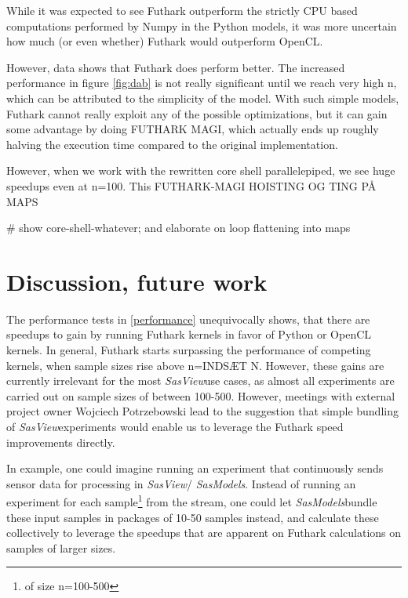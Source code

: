 \documentclass[11pt]{article}
\newcommand{\sasmodels}{\textit{SasModels}}
\newcommand{\sasview}{\textit{SasView}}
\begin{document}
  \begin{mdframed}[
    frametitle={Why does Futhark perform faster than OpenCL?},
    nobreak=true]
While it was expected to see Futhark outperform the strictly CPU based 
computations performed by Numpy in the Python models, it was more uncertain
how much (or even whether) Futhark would outperform OpenCL.

However, data shows that Futhark does perform better. The increased performance 
in figure \ref{fig:dab} is not really significant until we reach very high n,
which can be attributed to the simplicity of the model. With such simple models,
Futhark cannot really exploit any of the possible optimizations, but it can gain
some advantage by doing FUTHARK MAGI, which actually ends up roughly halving the 
execution time compared to the original implementation.

However, when we work with the rewritten core shell parallelepiped, we see huge
speedups even at n=100. This 
FUTHARK-MAGI HOISTING OG TING PÅ MAPS

\# show core-shell-whatever; and elaborate on loop flattening into maps
\end{mdframed}


\section{Discussion, future work}
\label{sec:discussion}
The performance tests in \ref{performance} unequivocally shows, that
there are speedups to gain by running Futhark kernels in favor of Python or
OpenCL kernels.
In general, Futhark starts surpassing the performance of competing kernels, when
sample sizes rise above n=INDSÆT N. However, these gains are currently
irrelevant for the most \sasview use cases, as almost all
experiments are carried out on sample sizes of between 100-500.
However, meetings with external project owner Wojciech Potrzebowski lead to the
suggestion that simple bundling of \sasview experiments would enable us
to leverage the Futhark speed improvements directly.

In example, one could imagine running an experiment that continuously sends
sensor data for processing in \sasview / \sasmodels.
Instead of running an experiment for each sample\footnote{of size n=100-500}
from the stream, one could let \sasmodels bundle these input samples in packages
of 10-50 samples
instead, and calculate these collectively to leverage the speedups that are
apparent on Futhark calculations on samples of larger sizes.
\end{document}
